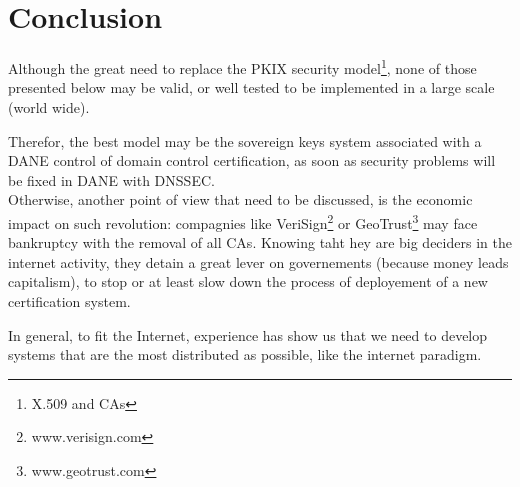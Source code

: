 \documentclass[journal, a4paper]{IEEEtran}
\begin{document}
\section{Conclusion}
\label{conclusion}

Although the great need to replace the PKIX security model\footnote{X.509 and CAs}, none of those presented below may be valid, or well tested to be implemented in a large scale (world wide).

Therefor, the best model may be the sovereign keys system associated with a DANE control of domain control certification, as soon as security problems will be fixed in DANE with DNSSEC.\\

Otherwise, another point of view that need to be discussed, is the economic impact on such revolution: compagnies like VeriSign\footnote{www.verisign.com} or GeoTrust\footnote{www.geotrust.com} may face bankruptcy with the removal of all CAs. Knowing taht hey are big deciders in the internet activity, they detain a great lever on governements (because money leads capitalism), to stop or at least slow down the process of deployement of a new certification system.

In general, to fit the Internet, experience has show us that we need to develop systems that are the most distributed as possible, like the internet paradigm.

\pagebreak

\nocite{*}
\end{document}
